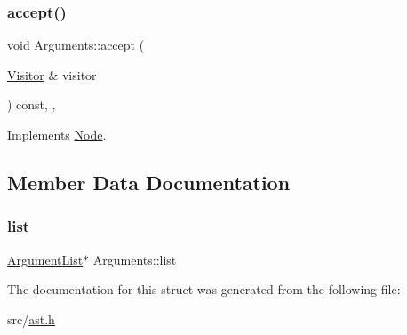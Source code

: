 \subsubsection{\texorpdfstring{accept()}{accept()}}
{\footnotesize\ttfamily void Arguments\+::accept (\begin{DoxyParamCaption}\item[{\hyperlink{struct_visitor}{Visitor} \&}]{visitor }\end{DoxyParamCaption}) const\hspace{0.3cm}{\ttfamily [inline]}, {\ttfamily [override]}, {\ttfamily [virtual]}}



Implements \hyperlink{struct_node_a10bd7af968140bbf5fa461298a969c71}{Node}.



\subsection{Member Data Documentation}
\mbox{\label{struct_arguments_a05f7d1acffd6f78b6aa33f62dd7984af}} 
\subsubsection{\texorpdfstring{list}{list}}
{\footnotesize\ttfamily \hyperlink{struct_argument_list}{Argument\+List}$\ast$ Arguments\+::list}



The documentation for this struct was generated from the following file\+:\begin{DoxyCompactItemize}
\item 
src/\hyperlink{ast_8h}{ast.\+h}\end{DoxyCompactItemize}
